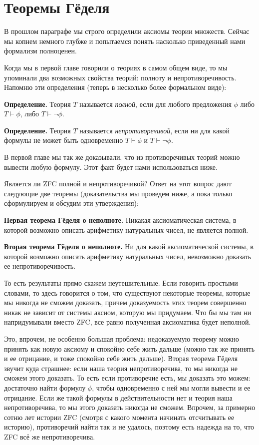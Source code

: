 \section{Теоремы Гёделя}

В прошлом параграфе мы строго определили аксиомы теории множеств. Сейчас мы копнем немного глубже и попытаемся понять насколько приведенный нами формализм полноценен.

Когда мы в первой главе говорили о теориях в самом общем виде, то мы упоминали два возможных свойства теорий: полноту и непротиворечивость. Напомню эти определения (теперь в несколько более формальном виде):

{\bfseries Определение.} Теория $T$ называется {\slshape полной}, если для любого предложения $\phi$ либо $T\vdash\phi$, либо $T\vdash\neg\phi$.

{\bfseries Определение.} Теория $T$ называется {\slshape непротиворечивой}, если ни для какой формулы не может быть одновременно $T\vdash \phi$ и $T\vdash\neg\phi$.

В первой главе мы так же доказывали, что из противоречивых теорий можно вывести любую формулу. Этот факт будет нами использоваться ниже.

Является ли ZFC полной и непротиворечивой? Ответ на этот вопрос дают следующие две теоремы (доказательства мы проведем ниже, а пока только сформулируем и обсудим эти утверждения):

{\bfseries Первая теорема Гёделя о неполноте.} Никакая аксиоматическая система, в которой возможно описать арифметику натуральных чисел, не является полной.

{\bfseries Вторая теорема Гёделя о неполноте.} Ни для какой аксиоматической системы, в которой возможно описать арифметику натуральных чисел, невозможно доказать ее непротиворечивость.

То есть результаты прямо скажем неутешительные. Если говорить простыми словами, то здесь говорится о том, что существуют некоторые теоремы, которые мы никогда не сможем доказать, причем доказуемость этих теорем совершенно никак не зависит от системы аксиом, которую мы придумаем. Что бы мы там ни напридумывали вместо ZFC, все равно полученная аксиоматика будет неполной.

Это, впрочем, не особенно большая проблема: недоказуемую теорему можно принять как новую аксиому и спокойно себе жить дальше (можно так же принять и ее отрицание, и тоже спокойно себе жить дальше). Вторая теорема Гёделя звучит куда страшнее: если наша теория непротиворечива, то мы никогда не сможем этого доказать. То есть если противоречие есть, мы доказать это можем: достаточно найти формулу $\phi$, чтобы одновременно с ней мы могли вывести и ее отрицание. Если же такой формулы в действительности нет и теория наша непротиворечива, то мы этого доказать никогда не сможем. Впрочем, за примерно сотню лет истории ZFC (смотря с какого момента начинать отсчитывать ее историю), противоречий найти так и не удалось, поэтому есть надежда на то, что ZFC всё же непротиворечива.

